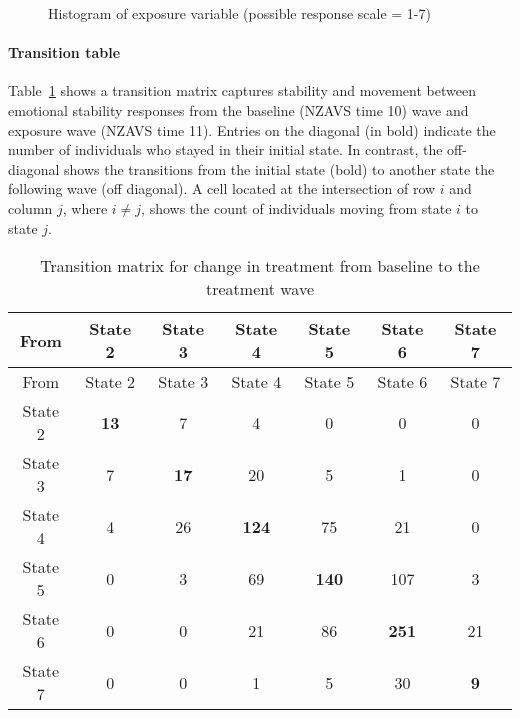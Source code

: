 \documentclass[
  singlecolumn]{article}
\let\oldparagraph\paragraph
\renewcommand{\paragraph}[1]{\oldparagraph{#1}\mbox{}}
\begin{document}
\begin{figure}


\caption{\label{fig-histogram-emotional}Histogram of exposure variable
(possible response scale = 1-7)}

\end{figure}%

\paragraph{Transition table}\label{transition-table-2}

Table~\ref{tbl-transition-emotional} shows a transition matrix captures
stability and movement between emotional stability responses from the
baseline (NZAVS time 10) wave and exposure wave (NZAVS time 11). Entries
on the diagonal (in bold) indicate the number of individuals who stayed
in their initial state. In contrast, the off-diagonal shows the
transitions from the initial state (bold) to another state the following
wave (off diagonal). A cell located at the intersection of row \(i\) and
column \(j\), where \(i \neq j\), shows the count of individuals moving
from state \(i\) to state \(j\).

\begin{longtable}[]{@{}ccccccc@{}}
\caption{Transition matrix for change in treatment from baseline to the
treatment wave}\label{tbl-transition-emotional}\tabularnewline
\toprule\noalign{}
From & State 2 & State 3 & State 4 & State 5 & State 6 & State 7 \\
\midrule\noalign{}
\endfirsthead
\toprule\noalign{}
From & State 2 & State 3 & State 4 & State 5 & State 6 & State 7 \\
\midrule\noalign{}
\endhead
\bottomrule\noalign{}
\endlastfoot
State 2 & \textbf{13} & 7 & 4 & 0 & 0 & 0 \\
State 3 & 7 & \textbf{17} & 20 & 5 & 1 & 0 \\
State 4 & 4 & 26 & \textbf{124} & 75 & 21 & 0 \\
State 5 & 0 & 3 & 69 & \textbf{140} & 107 & 3 \\
State 6 & 0 & 0 & 21 & 86 & \textbf{251} & 21 \\
State 7 & 0 & 0 & 1 & 5 & 30 & \textbf{9} \\
\end{longtable}
\end{document}
